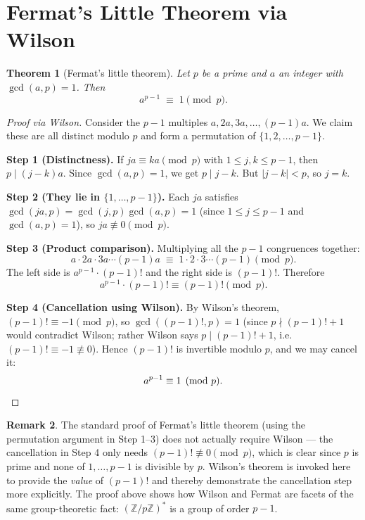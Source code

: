 \documentclass[12pt,a4paper]{amsart}
\newtheorem{theorem}{Theorem}[section]
\theoremstyle{definition}
\newtheorem{remark}[theorem]{Remark}
\newcommand{\Z}{\mathbb{Z}}
\begin{document}
\section{Fermat's Little Theorem via Wilson}

\begin{theorem}[Fermat's little theorem]\label{thm:fermat}
  Let $p$ be a prime and $a$ an integer with $\gcd(a,p) = 1$.  Then
  \[
    a^{p-1} \;\equiv\; 1 \pmod p.
  \]
\end{theorem}

\begin{proof}[Proof via Wilson]
  Consider the $p-1$ multiples $a, 2a, 3a, \ldots, (p-1)a$.
  We claim these are all distinct modulo $p$ and form a permutation of
  $\{1, 2, \ldots, p-1\}$.

  \textbf{Step 1 (Distinctness).}
  If $ja \equiv ka \pmod p$ with $1 \leq j, k \leq p-1$, then
  $p \mid (j-k)a$.  Since $\gcd(a,p)=1$, we get $p \mid j-k$.
  But $|j-k| < p$, so $j = k$.

  \textbf{Step 2 (They lie in $\{1,\ldots,p-1\}$).}
  Each $ja$ satisfies $\gcd(ja, p) = \gcd(j,p)\gcd(a,p) = 1$
  (since $1 \leq j \leq p-1$ and $\gcd(a,p) = 1$), so $ja \not\equiv 0 \pmod p$.

  \textbf{Step 3 (Product comparison).}
  Multiplying all the $p-1$ congruences together:
  \[
    a \cdot 2a \cdot 3a \cdots (p-1)a \;\equiv\; 1 \cdot 2 \cdot 3 \cdots (p-1) \pmod p.
  \]
  The left side is $a^{p-1} \cdot (p-1)!$ and the right side is $(p-1)!$.
  Therefore
  \[
    a^{p-1} \cdot (p-1)! \equiv (p-1)! \pmod p.
  \]

  \textbf{Step 4 (Cancellation using Wilson).}
  By Wilson's theorem, $(p-1)! \equiv -1 \pmod p$, so $\gcd((p-1)!, p) = 1$
  (since $p \nmid (p-1)!+1$ would contradict Wilson; rather Wilson says
  $p \mid (p-1)!+1$, i.e.\ $(p-1)! \equiv -1 \not\equiv 0$).
  Hence $(p-1)!$ is invertible modulo $p$, and we may cancel it:
  \[
    a^{p-1} \equiv 1 \pmod p. \qedhere
  \]
\end{proof}

\begin{remark}
  The standard proof of Fermat's little theorem (using the permutation
  argument in Step 1--3) does not actually require Wilson — the cancellation
  in Step 4 only needs $(p-1)! \not\equiv 0 \pmod p$, which is clear since
  $p$ is prime and none of $1, \ldots, p-1$ is divisible by $p$.
  Wilson's theorem is invoked here to provide the \emph{value} of $(p-1)!$
  and thereby demonstrate the cancellation step more explicitly.
  The proof above shows how Wilson and Fermat are facets of the same
  group-theoretic fact: $(\Z/p\Z)^*$ is a group of order $p-1$.
\end{remark}
\end{document}
